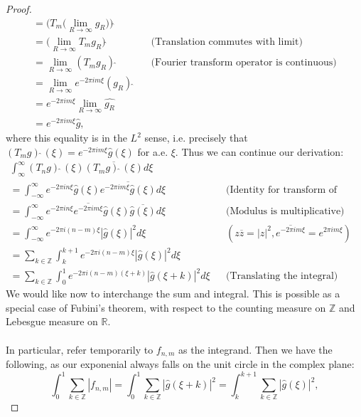 \documentclass[12pt]{article}
\newenvironment{ex}[2][Exercise]{\begin{trivlist}
\item[\hskip \labelsep {\bfseries #1}\hskip \labelsep {\bfseries #2.}]}{\end{trivlist}}
\begin{document}
\begin{ex}{12}
\begin{proof}
\begin{align*}
            = \Big (T_m \Big (\underset{R \rightarrow \infty}{\lim} g_R \Big)\Big)\hat{\;} \\
            = \Big ( \underset{R \rightarrow \infty}{\lim} T_mg_R \Big)\hat{\;} && \text{(Translation commutes with limit)} \\ 
            = \underset{R \rightarrow \infty}{\lim} (T_mg_R)\hat{\;} && \text{(Fourier transform operator is continuous)} \\
            = \underset{R \rightarrow \infty}{\lim} e^{-2\pi i m\xi}(g_R)\hat{\;} \\
            = e^{-2\pi i m\xi} \underset{R \rightarrow \infty}{\lim} \hat{g_R} \\
            = e^{-2\pi i m\xi}\hat{g},
        \end{align*}
        where this equality is in the $L^2$ sense, i.e. precisely that $(T_mg)\hat{\;}(\xi) = e^{-2\pi i m \xi}\hat{g}(\xi)$ for a.e. $\xi$. Thus we can continue our derivation:
        \begin{align*}
            \int_{\infty}^\infty (T_ng)\hat{\;}(\xi)\overline{(T_mg)\hat{\;}(\xi)} d\xi \\
            = \int_{-\infty}^\infty e^{-2\pi in\xi}\hat{g}(\xi)\overline{e^{-2\pi im\xi}\hat{g}(\xi)} d\xi && \text{(Identity for transform of translation)} \\
            = \int_{-\infty}^\infty e^{-2\pi in\xi}\overline{e^{-2\pi im\xi}}\hat{g}(\xi)\overline{\hat{g}(\xi)} d\xi && \text{(Modulus is multiplicative)} \\
            = \int_{-\infty}^\infty e^{-2\pi i(n - m)\xi}|\hat{g}(\xi)|^2 d\xi && (z\overline{z} = |z|^2, \overline{e^{-2\pi im\xi}} = e^{2\pi im\xi}) \\
            = \sum_{k \in \mathbb{Z}} \int_{k}^{k + 1} e^{-2\pi i(n - m)\xi}|\hat{g}(\xi)|^2 d\xi \\
            = \sum_{k \in \mathbb{Z}} \int_0^1 e^{{-2\pi i}(n - m)(\xi + k)}|\hat{g}(\xi + k)|^2 d\xi && \text{(Translating the integral)}
        \end{align*} 
        We would like now to interchange the sum and integral. This is possible as a special case of Fubini's theorem, with respect to the counting measure on $\mathbb{Z}$ and Lebesgue measure on $\mathbb{R}$. \\ \\
        In particular, refer temporarily to $f_{n,m}$ as the integrand. Then we have the following, as our exponenial always falls on the unit circle in the complex plane:
        $$\int_0^1 \sum_{k \in \mathbb{Z}} |f_{n,m}| = \int_0^1 \sum_{k \in \mathbb{Z}} |\hat{g}(\xi + k)|^2 = \int_{k}^{k + 1} \sum_{k \in \mathbb{Z}} |\hat{g}(\xi)|^2,$$

\end{proof}
\end{ex}
\end{document}
